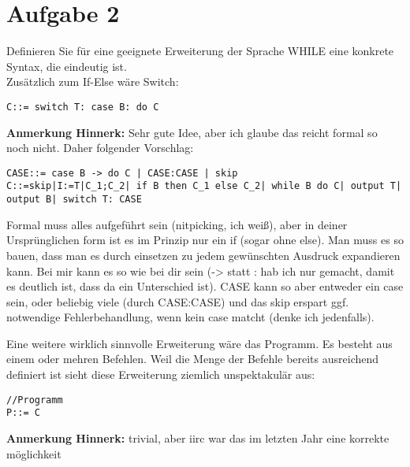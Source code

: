 \documentclass[ngerman,a4paper]{report}
\begin{document}
\section*{Aufgabe 2}
Definieren Sie für eine geeignete Erweiterung der Sprache WHILE eine konkrete Syntax, die eindeutig ist.\\
Zusätzlich zum If-Else wäre Switch:
\begin{lstlisting}
C::= switch T: case B: do C 
\end{lstlisting}
\textbf{Anmerkung Hinnerk:}
Sehr gute Idee, aber ich glaube das reicht formal so noch nicht. Daher folgender Vorschlag:\\
\begin{lstlisting}
CASE::= case B -> do C | CASE:CASE | skip
C::=skip|I:=T|C_1;C_2| if B then C_1 else C_2| while B do C| output T| output B| switch T: CASE
\end{lstlisting}
Formal muss alles aufgeführt sein (nitpicking, ich weiß), aber in deiner Ursprünglichen form ist es im Prinzip nur ein if (sogar ohne else). Man muss es so bauen, dass man es durch einsetzen zu jedem gewünschten Ausdruck expandieren kann. Bei mir kann es so wie bei dir sein (-> statt : hab ich nur gemacht, damit es deutlich ist, dass da ein Unterschied ist).
CASE kann so aber entweder ein case sein, oder beliebig viele (durch CASE:CASE) und das skip erspart ggf. notwendige Fehlerbehandlung, wenn kein case matcht (denke ich jedenfalls).

Eine weitere wirklich sinnvolle Erweiterung wäre das Programm. Es besteht aus einem oder mehren Befehlen. Weil die Menge der Befehle bereits ausreichend definiert ist sieht diese Erweiterung ziemlich unspektakulär aus:
\begin{lstlisting}
//Programm
P::= C 
\end{lstlisting}
\textbf{Anmerkung Hinnerk:} trivial, aber iirc war das im letzten Jahr eine korrekte möglichkeit
\end{document}

